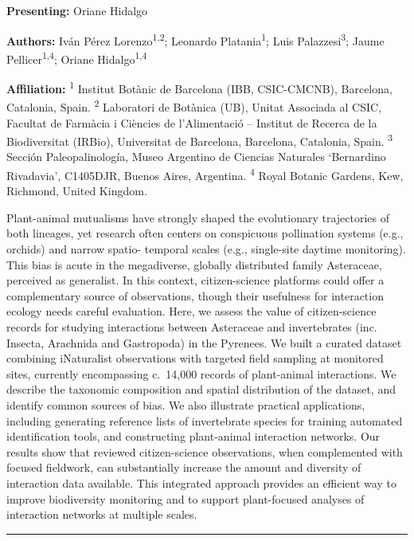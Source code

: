 \documentclass[
  letterpaper,
  DIV=11,
  numbers=noendperiod]{scrartcl}
\begin{document}
\textbf{Presenting:} Oriane Hidalgo

\textbf{Authors:} Iván Pérez Lorenzo\textsuperscript{1,2}; Leonardo
Platania\textsuperscript{1}; Luis Palazzesi\textsuperscript{3}; Jaume
Pellicer\textsuperscript{1,4}; Oriane Hidalgo\textsuperscript{1,4}

\textbf{Affiliation:} \textsuperscript{1} Institut Botànic de Barcelona
(IBB, CSIC-CMCNB), Barcelona, Catalonia, Spain. \textsuperscript{2}
Laboratori de Botànica (UB), Unitat Associada al CSIC, Facultat de
Farmàcia i Ciències de l'Alimentació -- Institut de Recerca de la
Biodiversitat (IRBio), Universitat de Barcelona, Barcelona, Catalonia,
Spain. \textsuperscript{3} Sección Paleopalinología, Museo Argentino de
Ciencias Naturales `Bernardino Rivadavia', C1405DJR, Buenos Aires,
Argentina. \textsuperscript{4} Royal Botanic Gardens, Kew, Richmond,
United Kingdom.

Plant-animal mutualisms have strongly shaped the evolutionary
trajectories of both lineages, yet research often centers on conspicuous
pollination systems (e.g., orchids) and narrow spatio- temporal scales
(e.g., single-site daytime monitoring). This bias is acute in the
megadiverse, globally distributed family Asteraceae, perceived as
generalist. In this context, citizen-science platforms could offer a
complementary source of observations, though their usefulness for
interaction ecology needs careful evaluation. Here, we assess the value
of citizen-science records for studying interactions between Asteraceae
and invertebrates (inc. Insecta, Arachnida and Gastropoda) in the
Pyrenees. We built a curated dataset combining iNaturalist observations
with targeted field sampling at monitored sites, currently encompassing
c.~14,000 records of plant-animal interactions. We describe the
taxonomic composition and spatial distribution of the dataset, and
identify common sources of bias. We also illustrate practical
applications, including generating reference lists of invertebrate
species for training automated identification tools, and constructing
plant-animal interaction networks. Our results show that reviewed
citizen-science observations, when complemented with focused fieldwork,
can substantially increase the amount and diversity of interaction data
available. This integrated approach provides an efficient way to improve
biodiversity monitoring and to support plant-focused analyses of
interaction networks at multiple scales.

\begin{center}\rule{0.5\linewidth}{0.5pt}\end{center}
\end{document}
